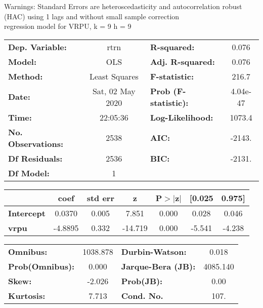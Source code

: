 Warnings: \newline
 [1] Standard Errors are heteroscedasticity and autocorrelation robust (HAC) using 1 lags and without small sample correction\\ 

regression model for VRPU, k = 9 h = 9\begin{center}
\begin{tabular}{lclc}
\toprule
\textbf{Dep. Variable:}    &       rtrn       & \textbf{  R-squared:         } &     0.076   \\
\textbf{Model:}            &       OLS        & \textbf{  Adj. R-squared:    } &     0.076   \\
\textbf{Method:}           &  Least Squares   & \textbf{  F-statistic:       } &     216.7   \\
\textbf{Date:}             & Sat, 02 May 2020 & \textbf{  Prob (F-statistic):} &  4.04e-47   \\
\textbf{Time:}             &     22:05:36     & \textbf{  Log-Likelihood:    } &    1073.4   \\
\textbf{No. Observations:} &        2538      & \textbf{  AIC:               } &    -2143.   \\
\textbf{Df Residuals:}     &        2536      & \textbf{  BIC:               } &    -2131.   \\
\textbf{Df Model:}         &           1      & \textbf{                     } &             \\
\bottomrule
\end{tabular}
\begin{tabular}{lcccccc}
                   & \textbf{coef} & \textbf{std err} & \textbf{z} & \textbf{P$> |$z$|$} & \textbf{[0.025} & \textbf{0.975]}  \\
\midrule
\textbf{Intercept} &       0.0370  &        0.005     &     7.851  &         0.000        &        0.028    &        0.046     \\
\textbf{vrpu}      &      -4.8895  &        0.332     &   -14.719  &         0.000        &       -5.541    &       -4.238     \\
\bottomrule
\end{tabular}
\begin{tabular}{lclc}
\textbf{Omnibus:}       & 1038.878 & \textbf{  Durbin-Watson:     } &    0.018  \\
\textbf{Prob(Omnibus):} &   0.000  & \textbf{  Jarque-Bera (JB):  } & 4085.140  \\
\textbf{Skew:}          &  -2.026  & \textbf{  Prob(JB):          } &     0.00  \\
\textbf{Kurtosis:}      &   7.713  & \textbf{  Cond. No.          } &     107.  \\
\bottomrule
\end{tabular}
\end{center}

